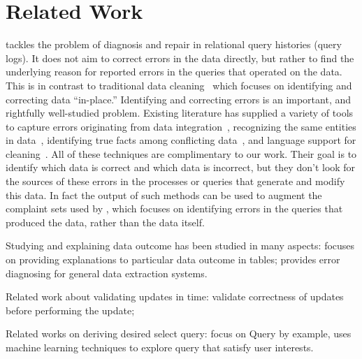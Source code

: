 
\section{Related Work}
\label{s:related}

\sys tackles the problem of diagnosis and repair in relational query
histories (query logs). It does not aim to correct errors in the data
directly, but rather to find the underlying reason for reported errors
in the queries that operated on the data. This is in contrast to
traditional data cleaning~\cite{rahm00, Raman01, Kalashnikov06,
Fan2008b} which focuses on identifying and correcting data
``in-place.'' Identifying and correcting errors is an important, and
rightfully well-studied problem. Existing literature has supplied a
variety of tools to capture errors originating from data
integration~\cite{Abiteboul99, Batini1986, Rahm2001, ParentS98},
recognizing the same entities in data~\cite{Koudas2006,
GruenheidDS14}, identifying true facts among conflicting
data~\cite{yin2008truth, DN09, ltm2012}, and language support for
cleaning~\cite{Galhardas2000}. All of these techniques are
complimentary to our work. Their goal is to identify which data is
correct and which data is incorrect, but they don't look for the
sources of these errors in the processes or queries that generate and
modify this data. In fact the output of such methods can be used to
augment the complaint sets used by \sys, which focuses on identifying
errors in the queries that produced the data, rather than the data
itself.




\cite{Golab2008,GolabKKS10 } 

Studying and explaining
data outcome has been studied in many aspects:
\cite{GebalyAGKS14}
focuses on providing 
explanations to particular data outcome in tables; \cite{wang2015}
provides error diagnosing for general data extraction systems. 


Related work about validating updates in time: 
\cite{Chen2011} validate correctness of updates before performing the update;


Related works on deriving desired select query: focus on 
Query by example, \cite{dimitriadou2014explore}  uses machine learning
techniques to explore query that satisfy user interests. 


